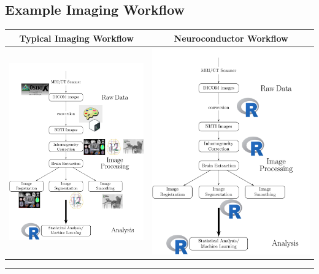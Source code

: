 \documentclass[final]{beamer}\usepackage[]{graphicx}\usepackage[]{color}
\begin{document}
\begin{frame}[fragile]
\begin{table}[!htb]
\begin{minipage}{0.40\linewidth}
\section{Example Imaging Workflow}
\newcommand{\mywidth}{0.17}


\begin{center}
\setlength\arrayrulewidth{5pt}
\begin{tabular}{c|c}
\LARGE Typical Imaging Workflow & \LARGE Neuroconductor Workflow \\ \hline
\includegraphics[clip, width=0.5\linewidth]{figures/workflow_edited_nonR.png} &
\includegraphics[clip, width=0.5\linewidth]{figures/workflow_edited_R.png}
\end{tabular}
\end{center}

\vspace*{-0.25cm}
\noindent\rule{\linewidth}{5pt}


\end{minipage}
\end{table}
\end{frame}
\end{document}
